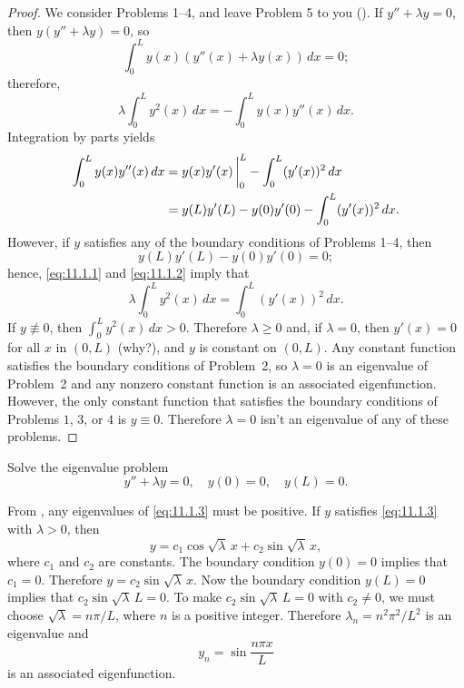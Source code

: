 \begin{proof}
We  consider Problems 1--4, and leave Problem 5 to you
(). If
$y''+\lambda y=0$, then
$y(y''+\lambda y)=0$, so
\[
\int_0^L y(x)(y''(x)+\lambda y(x))\,dx=0;
\]
   therefore,
\begin{equation} \label{eq:11.1.1}
\lambda\int_0^L y^2(x)\,dx=-\int_0^L y(x)y''(x)\, dx.
\end{equation}
Integration by parts yields
\begin{equation} \label{eq:11.1.2}
\begin{aligned}
\int_0^L y(x)y''(x)\, dx
&=y(x)y'(x)\,\bigg|_{0}^{L}-\int_0^L(y'(x))^2\,dx\\
&=y(L)y'(L)-y(0)y'(0)-\int_0^L (y'(x))^2\,dx.
\end{aligned}
\end{equation}
However, if $y$ satisfies any of the boundary conditions of Problems
1--4, then
\[
y(L)y'(L)-y(0)y'(0)=0;
\]
hence, \eqref{eq:11.1.1} and \eqref{eq:11.1.2} imply that
\[
\lambda\int_0^L y^2(x)\,dx=\int_0^L (y'(x))^2\, dx.
\]
If $y\not\equiv0$, then
$\int_0^L y^2(x)\,dx>0$. Therefore
 $\lambda\ge0$ and,  if  $\lambda=0$, then $y'(x)=0$ for all $x$
in
$(0,L)$ (why?), and  $y$ is constant on $(0,L)$.
Any constant function satisfies the boundary conditions of Problem~2,
so $\lambda=0$ is an eigenvalue of Problem~2 and any nonzero constant
function is an associated eigenfunction. However, the only constant
function that satisfies the boundary conditions of Problems $1$, $3$, or
$4$ is $y\equiv0$. Therefore $\lambda=0$ isn't  an eigenvalue of any of
these problems.
\end{proof}

\begin{example}[Problem 1]\label{example:11.1.1}
Solve the  eigenvalue problem
\begin{equation} \label{eq:11.1.3}
y''+\lambda y=0,\quad y(0)=0,\quad y(L)=0.
\end{equation}
\end{example}

\begin{solution}
From , any eigenvalues of \eqref{eq:11.1.3} must be
positive. If $y$ satisfies \eqref{eq:11.1.3} with $\lambda>0$, then
\[
y=c_1\cos\sqrt\lambda\, x+c_2\sin\sqrt\lambda\, x,
\]
where $c_1$ and $c_2$ are constants. The boundary condition $y(0)=0$
implies that $c_1=0$. Therefore $y=c_2\sin\sqrt\lambda\, x$. Now the
boundary condition $y(L)=0$ implies that $c_2\sin\sqrt\lambda\, L=0$.
To make $c_2\sin\sqrt\lambda\, L=0$ with $c_2\ne0$, we must choose
$\sqrt\lambda=n\pi/L$, where $n$ is a positive integer. Therefore
$\lambda_n=n^2\pi^2/L^2$ is an eigenvalue and
\[
y_n=\sin\frac{n\pi x}{L}
\]
is an associated eigenfunction.
\end{solution}

